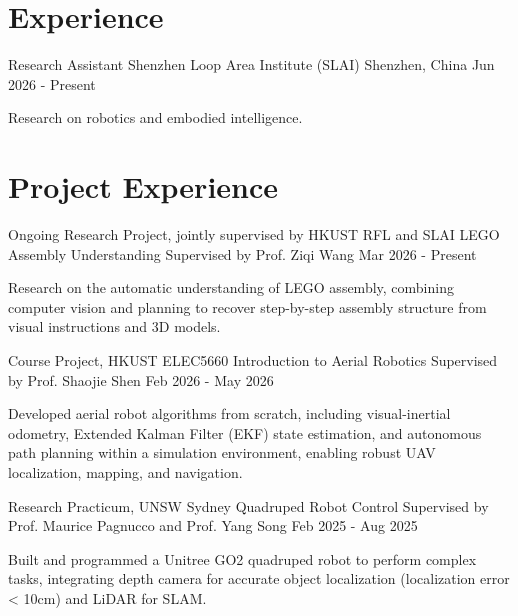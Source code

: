 \section{Experience}
\cventry
{Research Assistant} %
{Shenzhen Loop Area Institute (SLAI)} %
{Shenzhen, China} %
{Jun 2026 - Present} %
\begin{cvitems}
\item {Research on robotics and embodied intelligence.}
\end{cvitems}

\section{Project Experience}

\cventry
{Ongoing Research Project, jointly supervised by HKUST RFL and SLAI} %
{LEGO Assembly Understanding} %
{Supervised by Prof. Ziqi Wang} %
{Mar 2026 - Present} %
\begin{cvitems}
\item {Research on the automatic understanding of LEGO assembly, combining computer vision and planning to recover step-by-step assembly structure from visual instructions and 3D models.}
\end{cvitems}

\cventry
{Course Project, HKUST} %
{ELEC5660 Introduction to Aerial Robotics} %
{Supervised by Prof. Shaojie Shen} %
{Feb 2026 - May 2026} %
\begin{cvitems}
\item {Developed aerial robot algorithms from scratch, including visual-inertial odometry, Extended Kalman Filter (EKF) state estimation, and autonomous path planning within a simulation environment, enabling robust UAV localization, mapping, and navigation.}
\end{cvitems}

\cventry
{Research Practicum, UNSW Sydney} %
{Quadruped Robot Control} %
{Supervised by Prof. Maurice Pagnucco and Prof. Yang Song} %
{Feb 2025 - Aug 2025} %
\begin{cvitems}
\item {Built and programmed a Unitree GO2 quadruped robot to perform complex tasks, integrating depth camera for accurate object localization (localization error < 10cm) and LiDAR for SLAM.}
\end{cvitems}

